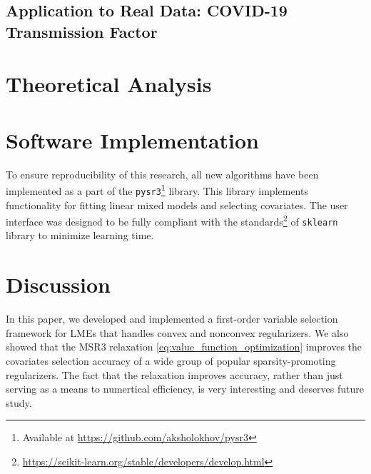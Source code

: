 \subsection{Application to Real Data: COVID-19 Transmission Factor}

\section{Theoretical Analysis}


\section{Software Implementation}
To ensure reproducibility of this research, all new algorithms have been implemented as a part of the \texttt{pysr3}\footnote{Available at \href{https://github.com/aksholokhov/pysr3}{https://github.com/aksholokhov/pysr3}} library. This library implements functionality for fitting linear mixed models and selecting covariates. The user interface was designed to be fully compliant with the standards\footnote{\href{https://scikit-learn.org/stable/developers/develop.html}{https://scikit-learn.org/stable/developers/develop.html}} of \texttt{sklearn} library to minimize learning time. 

    





\section{Discussion}
\label{sec:discussion}

    In this paper, we developed and implemented a first-order variable selection framework for LMEs that handles convex and nonconvex regularizers. We also showed that 
    the MSR3 relaxation \eqref{eq:value_function_optimization} 
improves the covariates selection accuracy of a wide group of popular sparsity-promoting regularizers. The fact that the relaxation improves accuracy, rather than just serving as a means to {numertical efficiency, %
     is very interesting and deserves future study.} %
    
